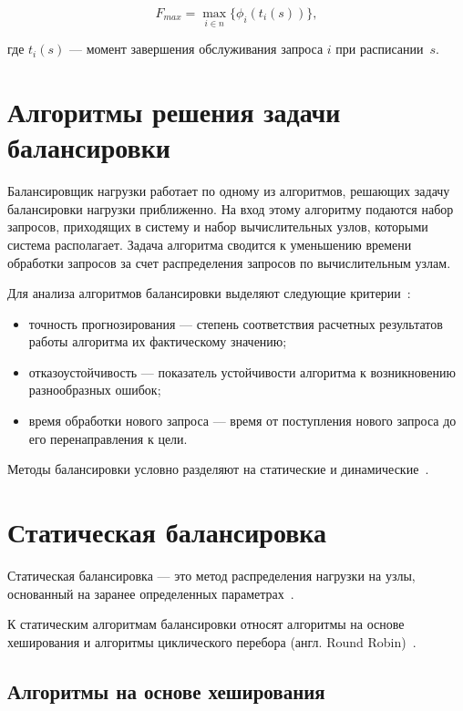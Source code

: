 \begin{equation}
	\label{eq:main_task}	
	F_{max} =   \max_{i \in n} \{\phi_i(t_i(s))\}, 
\end{equation}

где $t_i(s)$ --- момент завершения обслуживания запроса $i$ при расписании~$s$.

\section{Алгоритмы решения задачи балансировки}

Балансировщик нагрузки работает по одному из алгоритмов, решающих задачу балансировки нагрузки приближенно.
На вход этому алгоритму подаются набор запросов, приходящих в систему и набор вычислительных узлов, которыми система располагает.
Задача алгоритма сводится к уменьшению времени обработки запросов за счет распределения запросов по вычислительным узлам.

Для анализа алгоритмов балансировки выделяют следующие критерии~\cite{com_analysis}:
\begin{itemize}
	\item точность прогнозирования --- степень соответствия расчетных результатов работы алгоритма их фактическому значению;  
	\item отказоустойчивость --- показатель устойчивости алгоритма к возникновению разнообразных ошибок;
	\item время обработки нового запроса --- время от поступления нового запроса до его перенаправления к цели.
\end{itemize}

Методы балансировки условно разделяют на статические и динамические~\cite{drr, com_analysis, rate_comp}. 

\section{Статическая балансировка}

Статическая балансировка --- это метод распределения нагрузки на узлы, основанный на заранее определенных параметрах~\cite{com_analysis, intuit}.

К статическим алгоритмам балансировки относят алгоритмы на основе хеширования и алгоритмы циклического перебора (англ. Round Robin)~\mbox{\cite{nginx, aws, haproxy, part_algos, com_analysis}}.

\subsection{Алгоритмы на основе хеширования}

